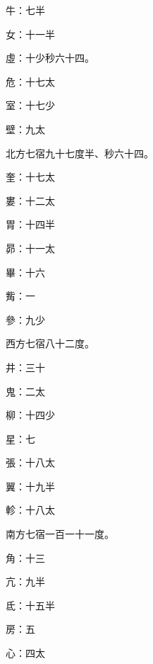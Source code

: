 \begin{pinyinscope}
 牛：七半



 女：十一半



 虛：十少秒六十四。



 危：十七太



 室：十七少



 壁：九太



 北方七宿九十七度半、秒六十四。



 奎：十七太



 婁：十二太



 胃：十四半



 昴：十一太



 畢：十六



 觜：一



 參：九少



 西方七宿八十二度。



 井：三十



 鬼：二太



 柳：十四少



 星：七



 張：十八太



 翼：十九半



 軫：十八太



 南方七宿一百一十一度。



 角：十三



 亢：九半



 氐：十五半



 房：五



 心：四太




\end{pinyinscope}
